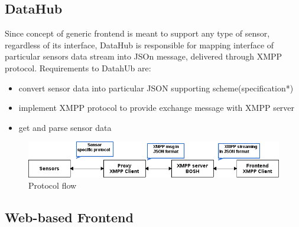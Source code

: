 	\subsection{DataHub}
  Since concept of generic frontend is meant to support any type of sensor, regardless of its interface, DataHub is responsible for mapping interface of particular sensors data stream into JSOn message, delivered through XMPP protocol. Requirements to DatahUb are:
  \begin{itemize}
  \item convert sensor data into particular JSON supporting scheme(specification*)
  \item implement XMPP protocol to provide exchange message with XMPP server
  \item get and parse sensor data
  \end{itemize}
    \begin{figure}[!ht]
    \centering
    \includegraphics[scale=0.5]{images/Protocol_flow.png}   
    \caption[Protocol flow]{Protocol flow}
    \label{img:protocol}                           
    \end{figure}

  \subsection{Web-based Frontend}
